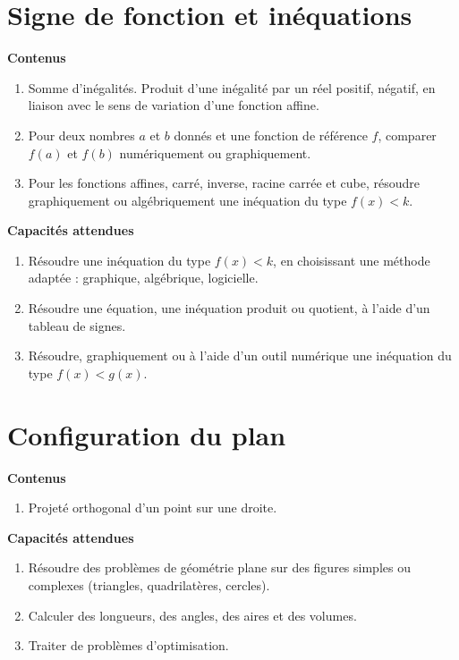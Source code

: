 \documentclass[10pt,a4paper]{article}
\begin{document}
\section{Signe de fonction et inéquations}

\textbf{Contenus}

\begin{enumerate}
\item Somme d'inégalités. Produit d'une inégalité par un réel positif, négatif, en liaison avec le sens de variation d'une fonction affine.
\item Pour deux nombres $a$ et $b$ donnés et une fonction de référence $f$, comparer $f(a)$ et $f(b)$ numériquement ou graphiquement.
\item  Pour les fonctions affines, carré, inverse, racine carrée et cube, résoudre 
graphiquement ou algébriquement une inéquation du type $f(x) < k$. 
\end{enumerate}

\textbf{Capacités attendues}

\begin{enumerate}
\item  Résoudre une inéquation du type $f(x) < k$, en choisissant une méthode adaptée : graphique, algébrique, logicielle.
\item  Résoudre une équation, une inéquation produit ou quotient, à l'aide d'un tableau de 
signes.
\item  Résoudre, graphiquement ou à l'aide d'un outil numérique une inéquation du type $f(x) < g(x)$.
\end{enumerate}

 
 

\section{Configuration du plan}

\textbf{Contenus}

\begin{enumerate}
\item Projeté orthogonal d’un point sur une droite.
\end{enumerate}

\textbf{Capacités attendues}
 
\begin{enumerate}
\item Résoudre des problèmes de géométrie plane sur des figures simples ou complexes 
(triangles, quadrilatères, cercles).
\item  Calculer des longueurs, des angles, des aires et des volumes.
\item  Traiter de problèmes d’optimisation.
\end{enumerate}
\end{document}
